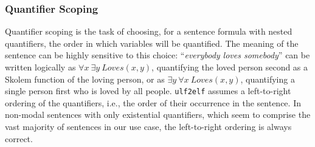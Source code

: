 

\subsubsection{Quantifier Scoping}
Quantifier scoping is the task of choosing, for a sentence formula with nested quantifiers, the order in which variables will be quantified. The meaning of the sentence can be highly sensitive to this choice: ``\textit{everybody loves somebody}'' can be written logically as $\forall x\ \exists y\ Loves(x, y)$, quantifying the loved person second as a Skolem function of the loving person, or as $\exists y\ \forall x\ Loves(x, y)$, quantifying a single person first who is loved by all people. \texttt{ulf2elf} assumes a left-to-right ordering of the quantifiers, i.e., the order of their occurrence in the sentence. In non-modal sentences with only existential quantifiers, which seem to comprise the vast majority of sentences in our use case, the left-to-right ordering is always correct.

